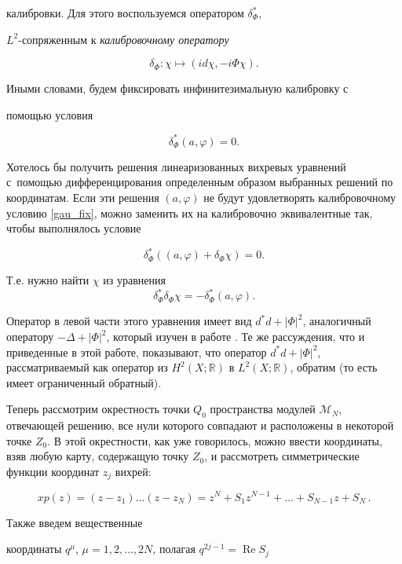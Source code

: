 калибровки. Для этого воспользуемся оператором $\delta_\Phi^*$,

$L^2$-сопряженным к \textit{калибровочному оператору}

$$

\delta_\Phi:\chi\longmapsto(id\chi,-i\Phi\chi).

$$

Иными словами, будем фиксировать инфинитезимальную калибровку с

помощью условия

\begin{equation}

\label{gau_fix} \delta_\Phi^*(a,\varphi)=0.

\end{equation}



Хотелось бы получить решения линеаризованных вихревых уравнений с~помощью дифференцирования определенным образом выбранных решений по координатам. Если эти решения $(a,\varphi)$ не будут удовлетворять калибровочному условию \eqref{gau_fix},  можно заменить их на калибровочно эквивалентные так, чтобы выполнялось условие 

$$\delta^*_\Phi((a,\varphi)+\delta_\Phi\chi)=0.$$

Т.е. нужно найти $\chi$ из уравнения $$\delta^*_\Phi\delta_\Phi\chi=-\delta^*_\Phi(a,\varphi).$$ 

Оператор в левой части этого уравнения имеет вид $d^*d+|\Phi|^2$, аналогичный оператору $-\Delta+|\Phi|^2$, который изучен в работе  \cite{palv:palvelev1}. Те же рассуждения, что и приведенные в этой работе, показывают, что оператор $d^*d+|\Phi|^2$, рассматриваемый как оператор из $H^2(X;\mathbb R)$ в $L^2(X;\mathbb R)$, обратим (то есть имеет ограниченный обратный). 



Теперь рассмотрим окрестность точки $Q_0$ пространства модулей $\mathcal  M_N$, отвечающей решению, все нули которого совпадают и расположены в некоторой точке $Z_0$. В этой окрестности, как уже говорилось, можно ввести координаты, взяв любую карту, содержащую точку $Z_0$, и рассмотреть симметрические функции координат $z_j$ вихрей:

$$x

p(z)=(z-z_1)\dots(z-z_N)=z^N+S_1z^{N-1}+\dots+S_{N-1}z+S_N\,.

$$

Также введем вещественные

координаты $q^{\mu}$, $\mu=1, 2,\dots, 2N$, полагая $q^{2j-1}=\mathop{\mathrm {Re}}S_j$

